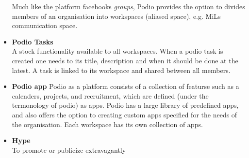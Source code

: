 \begin{itemize}
	Much like the platform facebooks \emph{groups}, Podio provides the option to divides members of an organisation into workspaces (aliased space), e.g. MiLs communication space.
	\item \textbf{Podio Tasks}\\
	A stock functionality available to all workspaces. When a podio task is created one needs to its title, description and when it should be done at the latest. A task is linked to its workspace and shared between all members.
	\item \textbf{Podio app}
	Podio as a platform consists of a collection of featurse such as a calenders, projects, and recruitment, which are defined (under the termonology of podio) as apps. Podio has a large library of predefined apps, and also offers the option to creating custom apps specified for the needs of the organisation. Each workspace has its own collection of apps.
	\item \textbf{Hype}\\
	To promote or publicize extravagantly

\end{itemize}